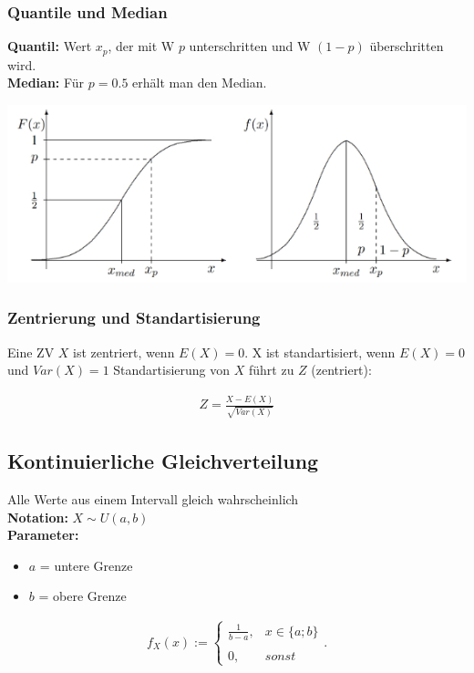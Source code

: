 \documentclass[10pt,a4paper]{article}
\begin{document}
      \subsubsection{Quantile und Median}
      \textbf{Quantil:} Wert $x_p$, der mit W $p$ unterschritten und W $(1-p)$ überschritten wird. \\
      \textbf{Median:} Für $p=0.5$ erhält man den Median.
      \begin{center}
          \includegraphics[width=.5\textwidth]{./img/quant.png}
      \end{center}

  \subsubsection{Zentrierung und Standartisierung}
  Eine ZV $X$ ist zentriert, wenn $E(X) = 0$.
  X ist standartisiert, wenn $E(X) = 0$ und $Var(X) = 1$
  Standartisierung von $X$ führt zu $Z$ (zentriert):
      \begin{mdframed}[style=exercise]
        \begin{align}
            Z = \frac{X-E(X)}{\sqrt{Var(X)}}
        \end{align}
      \end{mdframed}

\subsection{Kontinuierliche Gleichverteilung}
Alle Werte aus einem Intervall gleich wahrscheinlich \\
\textbf{Notation:} $X \sim U(a,b)$ \\
\textbf{Parameter:} \begin{itemize}
    \item $a$ = untere Grenze
    \item $b$ = obere Grenze
\end{itemize}

  \begin{mdframed}[style=exercise]
    \begin{align}
        f_X(x):=\left\{\begin{array}{ll} \frac{1}{b-a}, & x \in \{a;b\} \\ \\
        0, & sonst \end{array}\right. .
    \end{align}
  \end{mdframed}
  
\end{document}
